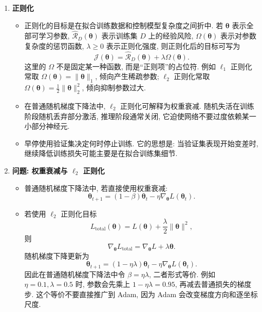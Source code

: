 \documentclass{../nndlcourse}
\begin{document}
\begin{enumerate}
    \item \textbf{正则化}
    \begin{itemize}
        \item 正则化的目标是在拟合训练数据和控制模型复杂度之间折中. 若 $\boldsymbol{\theta}$ 表示全部可学习参数, $\hat{\mathcal{R}}_D(\boldsymbol{\theta})$ 表示训练集 $D$ 上的经验风险, $\Omega(\boldsymbol{\theta})$ 表示对参数复杂度的惩罚函数, $\lambda\ge 0$ 表示正则化强度, 则正则化后的目标可写为
        \[
            \mathcal{J}(\boldsymbol{\theta})
            =
            \hat{\mathcal{R}}_D(\boldsymbol{\theta})
            +
            \lambda\Omega(\boldsymbol{\theta}).
        \]
        这里的 $\Omega$ 不是固定某一种函数, 而是“正则项”的占位符. 例如 $\ell_1$ 正则化常取 $\Omega(\boldsymbol{\theta})=\|\boldsymbol{\theta}\|_1$, 倾向产生稀疏参数; $\ell_2$ 正则化常取 $\Omega(\boldsymbol{\theta})=\frac{1}{2}\|\boldsymbol{\theta}\|_2^2$, 倾向抑制参数过大.
        \item 在普通随机梯度下降法中, $\ell_2$ 正则化可解释为权重衰减. 随机失活在训练阶段随机丢弃部分激活, 推理阶段通常关闭, 它迫使网络不要过度依赖某一小部分神经元.
        \item 早停使用验证集决定何时停止训练. 它的思想是: 当验证集表现开始变差时, 继续降低训练损失可能主要是在拟合训练集细节.
    \end{itemize}

    \item \textbf{问题: 权重衰减与 $\ell_2$ 正则化}
    \begin{itemize}
        \item 普通随机梯度下降法中, 若直接使用权重衰减:
        \[
            \boldsymbol{\theta}_{t+1}
            =
            (1-\beta)\boldsymbol{\theta}_t
            -
            \eta\nabla_{\boldsymbol{\theta}}L(\boldsymbol{\theta}_t).
        \]
        \item 若使用 $\ell_2$ 正则化目标
        \[
            L_{\mathrm{total}}(\boldsymbol{\theta})
            =
            L(\boldsymbol{\theta})
            +
            \frac{\lambda}{2}\|\boldsymbol{\theta}\|^2,
        \]
        则
        \[
            \nabla_{\boldsymbol{\theta}}L_{\mathrm{total}}
            =
            \nabla_{\boldsymbol{\theta}}L
            +
            \lambda\boldsymbol{\theta}.
        \]
        随机梯度下降更新为
        \[
            \boldsymbol{\theta}_{t+1}
            =
            (1-\eta\lambda)\boldsymbol{\theta}_t
            -
            \eta\nabla_{\boldsymbol{\theta}}L(\boldsymbol{\theta}_t).
        \]
        因此在普通随机梯度下降法中令 $\beta=\eta\lambda$, 二者形式等价. 例如 $\eta=0.1,\lambda=0.5$ 时, 参数会先乘上 $1-\eta\lambda=0.95$, 再减去普通损失的梯度步. 这个等价不要直接推广到 Adam, 因为 Adam 会改变梯度方向和逐坐标尺度.
    \end{itemize}
\end{enumerate}
\end{document}
